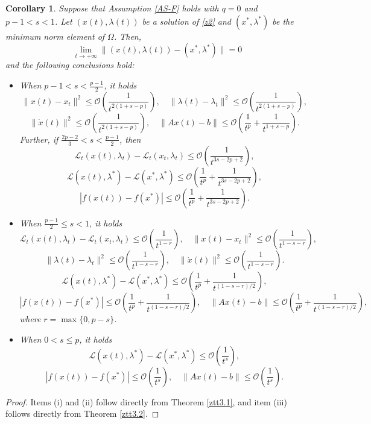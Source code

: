 \documentclass[review]{elsarticle}
\newtheorem{corollary}{Corollary}[section]
\begin{document}
	\begin{corollary}\label{corollary1}
		Suppose that  Assumption \ref{AS-F} holds with $q=0$ and $p-1<s<1$. Let $(x(t),\lambda(t))$ be a solution of \eqref{z2} and $(x^*,\lambda^*)$ be the minimum norm element of  $\Omega$. Then, 
		$$\lim_{t\rightarrow+\infty}\|(x(t), \lambda(t))-(x^*,\lambda^*)\|=0$$ and  the following conclusions hold:
		\begin{itemize}
			\item[(i)] When $p-1<s<\frac{p-1}{2}$,  it holds
			$$\|x(t)-x_t\|^2\leq\mathcal{O}\left(\frac{1}{t^{2(1+s-p)}}\right), \quad \|\lambda(t)-\lambda_t\|^2\leq\mathcal{O}\left(\frac{1}{t^{2(1+s-p)}}\right),$$ $$\|\dot{x}(t)\|^2\leq\mathcal{O}\left(\frac{1}{t^{2(1+s-p)}}\right), \quad \|Ax(t)-b\|\leq \mathcal{O}\left(\frac{1}{t^p}+\frac{1}{t^{1+s-p}}\right).$$
			Further, if $\frac{2p-2}{3}<s<\frac{p-1}{2}$, then
			$$\mathcal{L}_{t}(x(t),\lambda_t)-\mathcal{L}_{t}(x_t,\lambda_t)\leq\mathcal{O}\left(\frac{1}{t^{3s-2p+2}}\right),$$
			$$\mathcal{L}(x(t),\lambda^*)-\mathcal{L}(x^*,\lambda^*)\leq\mathcal{O}\left(\frac{1}{t^{p}}+\frac{1}{t^{3s-2p+2}}\right),$$ $$|f(x(t))-f(x^*)|\leq\mathcal{O}\left(\frac{1}{t^{p}}+\frac{1}{t^{3s-2p+2}}\right).$$
			\item[(ii)] When $\frac{p-1}{2}\leq s<1$,  it holds
			$$\mathcal{L}_{t}(x(t),\lambda_t)-\mathcal{L}_{t}(x_t,\lambda_t)\leq\mathcal{O}\left(\frac{1}{t^{1-r}}\right), \quad \|x(t)-x_t\|^2\leq\mathcal{O}\left(\frac{1}{t^{1-s-r}}\right),$$ $$\|\lambda(t)-\lambda_t\|^2\leq\mathcal{O}\left(\frac{1}{t^{1-s-r}}\right), \quad \|\dot{x}(t)\|^2\leq\mathcal{O}\left(\frac{1}{t^{1-s-r}}\right).$$
			$$\mathcal{L}(x(t),\lambda^*)-\mathcal{L}(x^*,\lambda^*)\leq\mathcal{O}\left(\frac{1}{t^{p}}+\frac{1}{t^{(1-s-r)/2}}\right),$$
			$$|f(x(t))-f(x^*)|\leq\mathcal{O}\left(\frac{1}{t^{p}}+\frac{1}{t^{(1-s-r)/2}}\right), \quad \|Ax(t)-b\|\leq\mathcal{O}\left(\frac{1}{t^{p}}+\frac{1}{t^{(1-s-r)/2}}\right),$$
			where $r=\max\{0,p-s\}$.
			\item[(iii)] When $0<s\leq p$, it holds
$$\mathcal{L}(x(t),\lambda^*)-\mathcal{L}(x^*,\lambda^*)\leq\mathcal{O}\left(\frac{1}{t^{s}}\right),$$
	$$|f(x(t))-f(x^*)|\leq\mathcal{O}\left(\frac{1}{t^{s}}\right), \quad \|Ax(t)-b\|\leq\mathcal{O}\left(\frac{1}{t^{s}}\right).$$

		\end{itemize}
	\end{corollary}
	\begin{proof}
Items (i) and (ii) follow directly from Theorem \ref{ztt3.1}, and item (iii) follows directly from  Theorem \ref{ztt3.2}.
\end{proof}
	
\end{document}
